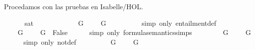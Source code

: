 \begin{isabellebody}
\begin{isamarkuptext}
  Procedamos con las pruebas en Isabelle/HOL.%
\end{isamarkuptext}\isamarkuptrue%
\isamarkupfalse%
\ {\isachardoublequoteopen}{\isasymGamma}\ {\isasymTTurnstile}\ {\isasymbottom}\ {\isasymlongleftrightarrow}\ {\isasymnot}\ sat\ {\isasymGamma}{\isachardoublequoteclose}\ \isanewline
%
\isadelimproof
%
\endisadelimproof
%
\isatagproof
{}\isamarkupfalse%
\ {\isacharminus}\isanewline
\ \ \isamarkupfalse%
\ {\isachardoublequoteopen}{\isasymGamma}\ {\isasymTTurnstile}\ {\isasymbottom}\ {\isacharequal}\ {\isacharparenleft}{\isasymforall}{\isasymA}{\isachardot}\ {\isacharparenleft}{\isacharparenleft}{\isasymforall}G\ {\isasymin}\ {\isasymGamma}{\isachardot}\ {\isasymA}\ {\isasymTurnstile}\ G{\isacharparenright}\ {\isasymlongrightarrow}\ {\isasymA}\ {\isasymTurnstile}\ {\isasymbottom}{\isacharparenright}{\isacharparenright}{\isachardoublequoteclose}\isanewline
\ \ \ \ \isamarkupfalse%
\ {\isacharparenleft}simp\ only{\isacharcolon}\ entailment{\isacharunderscore}def{\isacharparenright}\isanewline
\ \ \isamarkupfalse%
\ \isamarkupfalse%
\ {\isachardoublequoteopen}{\isasymdots}\ {\isacharequal}\ {\isacharparenleft}{\isasymforall}{\isasymA}{\isachardot}\ {\isacharparenleft}{\isacharparenleft}{\isasymforall}G\ {\isasymin}\ {\isasymGamma}{\isachardot}\ {\isasymA}\ {\isasymTurnstile}\ G{\isacharparenright}\ {\isasymlongrightarrow}\ False{\isacharparenright}{\isacharparenright}{\isachardoublequoteclose}\isanewline
\ \ \ \ \isamarkupfalse%
\ {\isacharparenleft}simp\ only{\isacharcolon}\ formula{\isacharunderscore}semantics{\isachardot}simps{\isacharparenleft}{}{\isacharparenright}{\isacharparenright}\isanewline
\ \ \isamarkupfalse%
\ \isamarkupfalse%
\ {\isachardoublequoteopen}{\isasymdots}\ {\isacharequal}\ {\isacharparenleft}{\isasymforall}{\isasymA}{\isachardot}\ {\isasymnot}{\isacharparenleft}{\isasymforall}G\ {\isasymin}\ {\isasymGamma}{\isachardot}\ {\isasymA}\ {\isasymTurnstile}\ G{\isacharparenright}{\isacharparenright}{\isachardoublequoteclose}\isanewline
\ \ \ \ \isamarkupfalse%
\ {\isacharparenleft}simp\ only{\isacharcolon}\ not{\isacharunderscore}def{\isacharparenright}\isanewline
\ \ \isamarkupfalse%
\ \isamarkupfalse%
\ {\isachardoublequoteopen}{\isasymdots}\ {\isacharequal}\ \ {\isacharparenleft}{\isasymnot}{\isacharparenleft}{\isasymexists}{\isasymA}{\isachardot}\ {\isasymforall}G\ {\isasymin}\ {\isasymGamma}{\isachardot}\ {\isasymA}\ {\isasymTurnstile}\ G{\isacharparenright}{\isacharparenright}{\isachardoublequoteclose}\isanewline

\end{isabellebody}

